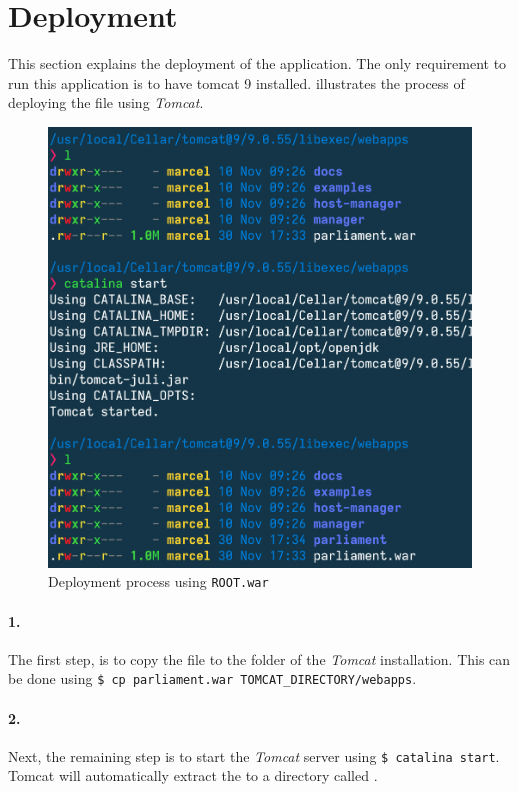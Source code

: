 \section{Deployment}\label{sec:03_depl}
This section explains the deployment of the application.
The only requirement to run this application is to have tomcat 9 installed.
 illustrates the process of deploying the  file using \textit{Tomcat}.
\begin{figure}[h]
\centering
\includegraphics[scale=0.5]{images/03_depl/process}
\caption{Deployment process using \texttt{ROOT.war}}
\label{fig:subsubsec:03_depl_process}
\end{figure}

\paragraph{1.}
The first step, is to copy the  file to the  folder of the \textit{Tomcat} installation.\newline
This can be done using \texttt{\$ cp parliament.war TOMCAT\_DIRECTORY/webapps}.

\paragraph{2.}
Next, the remaining step is to start the \textit{Tomcat} server using \texttt{\$ catalina start}. Tomcat will automatically extract the  to a directory called .

